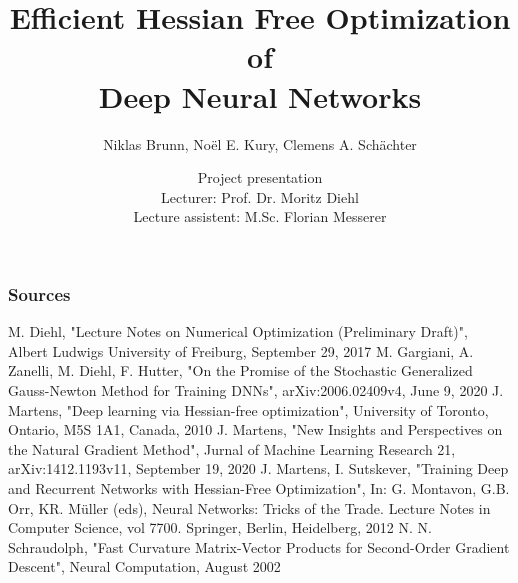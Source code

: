 \documentclass{beamer}
\title[Hessian Free Optimization]{Efficient Hessian Free Optimization of \\ Deep Neural Networks}
\subtitle{Niklas Brunn, No\"{e}l E. Kury, Clemens A. Schächter}
\author[Numerical Optimization]{Project presentation\\
Lecturer: Prof. Dr. Moritz Diehl\\
Lecture assistent: M.Sc. Florian Messerer}
\begin{document}
	
	\begin{frame}
		\titlepage
	\end{frame}
	
	
	
	
	


	\begin{frame}
		\frametitle{Sources}
		\begin{thebibliography}{9}
			
			 M. Diehl, "Lecture Notes on Numerical Optimization (Preliminary Draft)", Albert Ludwigs University of Freiburg, September 29, 2017	
			 M. Gargiani, A. Zanelli, M. Diehl, F. Hutter, "\text{}On the Promise of the Stochastic Generalized Gauss-Newton Method for Training DNNs",  arXiv:2006.02409v4, June 9, 2020 
			 J. Martens, "Deep learning via Hessian-free optimization", University of Toronto, Ontario, M5S 1A1, Canada, 2010
			 J. Martens, "New Insights and Perspectives on the Natural Gradient Method", Jurnal of Machine Learning Research 21, arXiv:1412.1193v11, September 19, 2020
			 J. Martens, I. Sutskever, "Training Deep and Recurrent Networks with Hessian-Free Optimization", In: G. Montavon, G.B. Orr, KR. Müller (eds), Neural Networks: Tricks of the Trade. Lecture Notes in Computer Science, vol 7700. Springer, Berlin, Heidelberg, 2012
			 N. N. Schraudolph, "Fast Curvature Matrix-Vector Products for Second-Order
			Gradient Descent", Neural Computation, August 2002
			
			
		\end{thebibliography}
	\end{frame}
	
\end{document}
